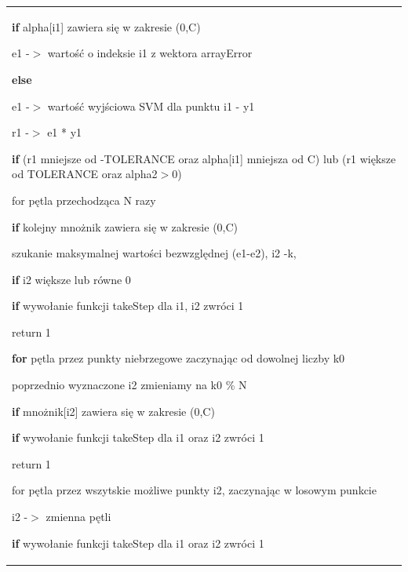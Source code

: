 \documentclass[[10pt,a4paper]{article}
\begin{document}
\begin{enumerate}
\begin{tabular}{|p{11.5cm}|}
\noindent 

\noindent \textbf{if} alpha[i1] zawiera się w zakresie (0,C)

 \hspace{1em}e1 -$>$ wartość o indeksie i1 z wektora arrayError

\noindent \textbf{else}

 \hspace{1em}e1 -$>$ wartość wyjściowa SVM dla punktu i1 - y1

\noindent r1 -$>$ e1 * y1

\noindent \textbf{if} (r1 mniejsze od -TOLERANCE oraz alpha[i1] mniejsza od C) lub (r1 większe od TOLERANCE oraz alpha2$>$0)

 \hspace{1em}for pętla przechodząca N razy

  \hspace{2em}\textbf{if} kolejny mnożnik zawiera się w zakresie (0,C)

   \hspace{3em}szukanie maksymalnej wartości bezwzględnej (e1-e2), i2 -k,

  \hspace{2em}\textbf{if} i2 większe lub równe 0

   \hspace{3em}\textbf{if} wywołanie funkcji takeStep dla i1, i2 zwróci 1

    \hspace{4em}return 1

 \hspace{1em}\textbf{for} pętla przez punkty niebrzegowe zaczynając od dowolnej liczby k0

  \hspace{2em}poprzednio wyznaczone i2 zmieniamy na k0 \% N

  \hspace{2em}\textbf{if} mnożnik[i2] zawiera się w zakresie (0,C)

   \hspace{3em}\textbf{if} wywołanie funkcji takeStep dla i1 oraz i2 zwróci 1

    \hspace{4em}return 1

 \hspace{1em}for pętla przez wszytskie możliwe punkty i2, zaczynając w losowym punkcie

  \hspace{2em}i2 -$>$ zmienna p\k{e}tli

   \hspace{3em}\textbf{if} wywołanie funkcji takeStep dla i1 oraz i2 zwróci 1


\end{tabular}
\end{enumerate}
\end{document}
